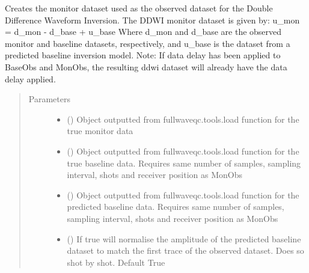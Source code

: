\documentclass[letterpaper,10pt,english]{sphinxmanual}
\begin{document}

\begin{fulllineitems}
\label{\detokenize{index:fullwaveqc.tools.ddwi}}
Creates the monitor dataset used as the observed dataset for the Double Difference Waveform Inversion.
The DDWI monitor dataset is given by: u\_mon = d\_mon - d\_base + u\_base
Where d\_mon and d\_base are the observed monitor and baseline datasets, respectively, and u\_base is the dataset from
a predicted baseline inversion model.
Note: If data delay has been applied to BaseObs and MonObs, the resulting ddwi dataset will already have the data
delay applied.
\begin{quote}\begin{description}
\item[{Parameters}] \leavevmode\begin{itemize}
\item {} 
 ({\hyperref[\detokenize{index:fullwaveqc.tools.SegyData}]{}}) \textendash{} Object outputted from fullwaveqc.tools.load function for the true monitor data

\item {} 
 ({\hyperref[\detokenize{index:fullwaveqc.tools.SegyData}]{}}) \textendash{} Object outputted from fullwaveqc.tools.load function for the true baseline data.
Requires same number of samples, sampling interval, shots and receiver position
as MonObs

\item {} 
 () \textendash{} Object outputted from fullwaveqc.tools.load function for the predicted baseline data.
Requires same number of samples, sampling interval, shots and receiver position
as MonObs

\item {} 
 (\sphinxstyleliteralemphasis{\sphinxupquote{, }}) \textendash{} If true will normalise the amplitude of the predicted baseline dataset to match
the first trace of the observed dataset. Does so shot by shot. Default True


\end{itemize}
\end{description}
\end{quote}
\end{fulllineitems}
\end{document}
